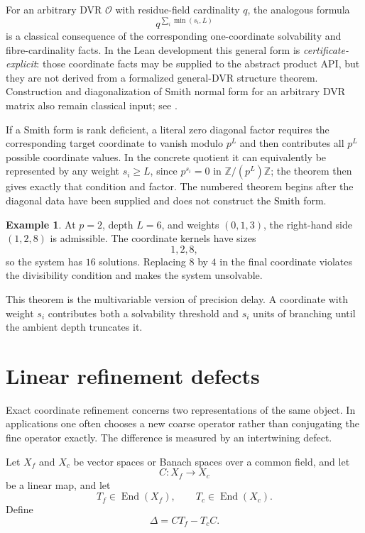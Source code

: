 \documentclass[11pt,a4paper]{article}
\theoremstyle{definition}
\newtheorem{example}[example]{Example}
\theoremstyle{remark}
\newcommand{\OO}{\mathcal O}
\newcommand{\End}{\operatorname{End}}
\providecommand{\End}{\operatorname{End}}
\providecommand{\Z}{\mathbb Z}
\providecommand{\OO}{\mathcal O}
\theoremstyle{definition}\newtheorem{construction}[theorem]{Construction}\newtheorem{certificate}[theorem]{Numerical Certificate}
\theoremstyle{remark}\newtheorem{boundary}[theorem]{Boundary}
\begin{document}
For an arbitrary DVR $\OO$ with residue-field cardinality $q$, the analogous
formula
\[
q^{\sum_i\min(s_i,L)}
\]
is a classical consequence of the corresponding one-coordinate solvability
and fibre-cardinality facts. In the Lean development this general form is
\emph{certificate-explicit}: those coordinate facts may be supplied to the
abstract product API, but they are not derived from a formalized general-DVR
structure theorem. Construction and diagonalization of Smith normal form for
an arbitrary DVR matrix also remain classical input; see
\cite{Serre1979,Lang2002}.

If a Smith form is rank deficient, a literal zero diagonal factor requires
the corresponding target coordinate to vanish modulo $p^L$ and then
contributes all $p^L$ possible coordinate values. In the concrete quotient it
can equivalently be represented by any weight $s_i\ge L$, since
$p^{s_i}=0$ in $\Z/(p^L)\Z$; the theorem then gives exactly that condition and
factor. The numbered theorem begins after the diagonal data have been
supplied and does not construct the Smith form.

\begin{example}
At $p=2$, depth $L=6$, and weights $(0,1,3)$, the right-hand side $(1,2,8)$ is admissible. The coordinate kernels have sizes
\[
1,2,8,
\]
so the system has $16$ solutions. Replacing $8$ by $4$ in the final coordinate violates the divisibility condition and makes the system unsolvable.
\end{example}

This theorem is the multivariable version of precision delay. A coordinate with weight $s_i$ contributes both a solvability threshold and $s_i$ units of branching until the ambient depth truncates it.


\section{Linear refinement defects}\label{sec:defects}

Exact coordinate refinement concerns two representations of the same object.  In applications one often chooses a new coarse operator rather than conjugating the fine operator exactly.  The difference is measured by an intertwining defect.

Let $X_f$ and $X_c$ be vector spaces or Banach spaces over a common field, and let
\[
C:X_f\longrightarrow X_c
\]
be a linear map,
and let
\[
T_f\in\End(X_f),
\qquad
T_c\in\End(X_c).
\]
Define
\[
\Delta=CT_f-T_cC.
\]
\end{document}
